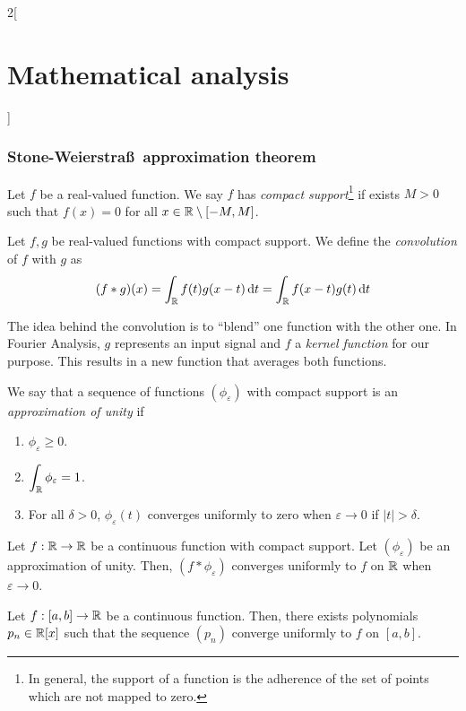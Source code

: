 \documentclass[../../../main_math.tex]{subfiles}
\begin{document}
\begin{multicols}{2}[\section{Mathematical analysis}]
  \subsubsection{Stone-Weierstra\ss\  approximation theorem}
  \begin{definition}
    Let $f$ be a real-valued function. We say $f$ has \emph{compact support}\footnote{In general, the support of a function is the adherence of the set of points which are not mapped to zero.} if exists $M>0$ such that $f(x)=0$ for all $x\in\mathbb{R} \setminus[-M,M]$.
  \end{definition}
  \begin{definition}
    Let $f,g$ be real-valued functions with compact support. We define the \emph{convolution} of $f$ with $g$ as $$(f*g)(x)=\int_{\mathbb{R}} f(t)g(x-t)\dd{t}=\int_{\mathbb{R}}f(x-t)g(t)\dd{t}$$
  \end{definition}
  \begin{remark}
    The idea behind the convolution is to ``blend'' one function with the other one. In Fourier Analysis, $g$ represents an input signal and $f$ a \emph{kernel function} for our purpose. This results in a new function that averages both functions.
  \end{remark}
  \begin{definition}
    We say that a sequence of functions $(\phi_\varepsilon)$ with compact support is an \emph{approximation of unity} if
    \begin{enumerate}
      \item $\phi_\varepsilon\geq 0$.
      \item $\displaystyle\int_{\mathbb{R}} \phi_\varepsilon=1$.
      \item For all $\delta>0$, $\phi_\varepsilon(t)$ converges uniformly to zero when $\varepsilon\rightarrow 0$ if $|t|>\delta$.
    \end{enumerate}
  \end{definition}
  \begin{lemma}
    Let $f:\mathbb{R} \rightarrow\mathbb{R} $ be a continuous function with compact support. Let $(\phi_\varepsilon)$ be an approximation of unity. Then, $(f*\phi_\varepsilon)$ converges uniformly to $f$ on $\mathbb{R} $ when $\varepsilon\rightarrow 0$.
  \end{lemma}
  \begin{theorem}\label{MA:weierstrasspolynomials}
    Let $f:[a,b]\rightarrow\mathbb{R} $ be a continuous function. Then, there exists polynomials $p_n\in\mathbb{R} [x]$ such that the sequence $(p_n)$ converge uniformly to $f$ on $[a,b]$.
  \end{theorem}

\end{multicols}
\end{document}
